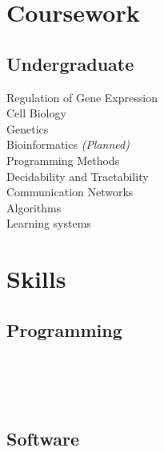 \documentclass[]{resume}
\begin{document}
\begin{minipage}[t]{0.33\textwidth}

\section{Coursework}
\subsection{Undergraduate}
Regulation of Gene Expression \\
Cell Biology \\
Genetics \\
Bioinformatics {\footnotesize \textit{(Planned)}}\\
\sectionsep
{}
Programming Methods \\
Decidability and Tractability \\
Communication Networks \\
Algorithms \\
Learning systems
\sectionsep

\section{Skills}
\subsection{Programming}
\\
\\
\\
\sectionsep

\subsection{Software}
\\
\\
\\
\\
\\
\\
\\
\\
\sectionsep


\end{minipage}
\end{document}

